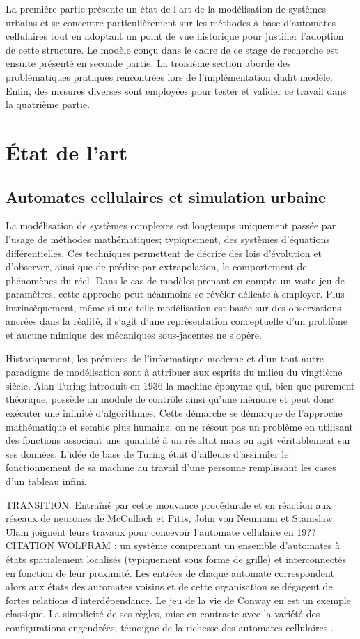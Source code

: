 \documentclass[12pt]{article}
\begin{document}
La première partie présente un état de l'art de la modélisation de
systèmes urbains et se concentre particulièrement sur les méthodes à
base d'automates cellulaires tout en adoptant un point de vue
historique pour justifier l'adoption de cette structure. Le modèle
conçu dans le cadre de ce stage de recherche est ensuite présenté en
seconde partie. La troisième section aborde des problématiques
pratiques rencontrées lors de l'implémentation dudit modèle. Enfin,
des mesures diverses sont employées pour tester et valider ce travail
dans la quatrième partie.

\section{\'Etat de l'art}

\subsection{Automates cellulaires et simulation urbaine}

La modélisation de systèmes complexes est longtemps uniquement passée
par l'usage de méthodes mathématiques; typiquement, des systèmes
d'équations différentielles. Ces techniques permettent de décrire des
lois d'évolution et d'observer, ainsi que de prédire par
extrapolation, le comportement de phénomènes du réel. Dans le cas de
modèles prenant en compte un vaste jeu de paramètres, cette approche
peut néanmoins se révéler délicate à employer. Plus intrinsèquement,
même si une telle modélisation est basée sur des observations ancrées
dans la réalité, il s'agit d'une représentation conceptuelle d'un
problème et aucune mimique des mécaniques sous-jacentes ne s'opère.

Historiquement, les prémices de l'informatique moderne et d'un tout
autre paradigme de modélisation sont à attribuer aux esprits du milieu
du vingtième siècle. Alan Turing introduit en 1936 la machine éponyme
qui, bien que purement théorique, possède un module de contrôle ainsi
qu'une mémoire et peut donc exécuter une infinité d'algorithmes. Cette
démarche se démarque de l'approche mathématique et semble plus
humaine; on ne résout pas un problème en utilisant des fonctions
associant une quantité à un résultat mais on agit véritablement sur
ses données. L'idée de base de Turing était d'ailleurs d'assimiler le
fonctionnement de sa machine au travail d'une personne remplissant les
cases d'un tableau infini.

TRANSITION. Entraîné par cette mouvance procédurale et en réaction aux
réseaux de neurones de McCulloch et Pitts, John von Neumann et
Stanislaw Ulam joignent leurs travaux pour concevoir l'automate
cellulaire en 19??  CITATION WOLFRAM : un système comprenant un
ensemble d'automates à états spatialement localisés (typiquement sous
forme de grille) et interconnectés en fonction de leur proximité. Les
entrées de chaque automate correspondent alors aux états des automates
voisins et de cette organisation se dégagent de fortes relations
d'interdépendance. Le jeu de la vie de Conway en est un exemple
classique. La simplicité de ses règles, mise en contraste avec la
variété des configurations engendrées, témoigne de la richesse des
automates cellulaires \cite{Gardner1970}.
\end{document}
